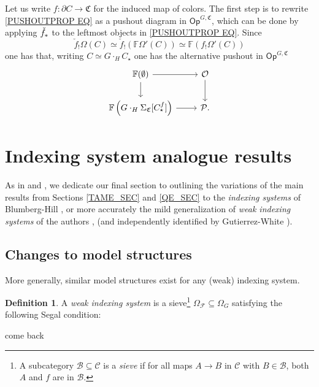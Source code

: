 \documentclass[a4paper,10pt
,draft
]{article}%
\numberwithin{equation}{section}
\numberwithin{figure}{section}
\theoremstyle{definition} %
\newtheorem{definition}[equation]{Definition}%
\newcommand{\F}{\ensuremath{\mathcal F}}
\newcommand{\1}{\ensuremath{\mathbbm 1}}%
\begin{document}
Let us write $f \colon \partial C \to \mathfrak{C}$
for the induced map of colors.
The first step is to rewrite \eqref{PUSHOUTPROP EQ} as a pushout diagram in $\mathsf{Op}^{G,\mathfrak{C}}$, which can be done by applying $\check{f}_{\**}$
to the leftmost objects in \eqref{PUSHOUTPROP EQ}.
Since
\[
\check{f}_{!} \Omega(C) \simeq 
\check{f}_{!} \left( \mathbb{F} \Omega'(C) \right) \simeq 
\mathbb{F} \left(f_{!}  \Omega'(C) \right)
\]
one has that, writing $C \simeq G \cdot_H C_{\star}$ one has the alternative pushout in $\mathsf{Op}^{G,\mathfrak{C}}$
\begin{equation}
\begin{tikzcd}
\mathbb{F} ( \emptyset ) \ar{r} \ar{d} & \mathcal{O} \ar{d}
\\
\mathbb{F} \left( 
G \cdot_H \Sigma_{\mathfrak{C}}[C^f_{\star}] \right) \ar{r} & \mathcal{P}.
\end{tikzcd}
\end{equation}










\section{Indexing system analogue results}\label{INDSYS SEC}

As in \cite[\S 6]{BP_edss} and \cite[\S 9]{Per18}, we dedicate our final section to 
outlining the variations of the main results from Sections \ref{TAME_SEC} and \ref{QE_SEC} to
the \textit{indexing systems} of Blumberg-Hill \cite{BH15}, or more accurately
the mild generalization of \textit{weak indexing systems} of the authors \cite[\S 9]{Per18}, \cite[\S4.4]{BP_geo} (and independently identified by Gutierrez-White \cite{GW18}).


\subsection{Changes to model structures}
More generally, similar model structures exist for any (weak) indexing system.
\begin{definition}
      A \textit{weak indexing system} is a sieve\footnote{
        A subcategory $\mathcal B \subseteq \mathcal C$ is a \textit{sieve} if for all maps $A \to B$ in $\mathcal C$
        with $B \in \mathcal B$, both $A$ and $f$ are in $\mathcal B$.}
      $\Omega_\F \subseteq \Omega_G$
      satisfying the following Segal condition:

      come back
\end{definition}
\end{document}
